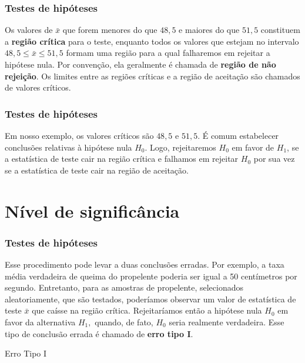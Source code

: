 \documentclass[14pt,aspectratio=1610]{beamer}
\begin{document}
\begin{frame}{}
\frametitle{Testes de hipóteses}
\begin{block}{}
\justifying
Os valores de $\bar{x}$ que forem menores do que $48,5$ e maiores do que $51,5$ constituem a \textbf{região crítica} para o teste, enquanto todos os valores que estejam 
no intervalo $48,5 \leq \bar{x}\leq 51,5$ formam uma região para a qual falharemos em rejeitar a hipótese nula. Por convenção, ela geralmente é chamada de 
\textbf{região de não rejeição}. Os limites entre as regiões críticas e a região de aceitação são chamados de valores críticos. 
 \end{block}
\end{frame}

\begin{frame}{}
\frametitle{Testes de hipóteses}
\begin{block}{}
\justifying
Em nosso exemplo, os valores críticos são $48,5$ e $51,5.$ É comum estabelecer conclusões relativas à hipótese nula $H_{0}.$ Logo, rejeitaremos $H_{0}$ em favor 
de $H_{1}$, se a estatística de teste cair na região crítica e falhamos em rejeitar $H_{0}$ por sua vez se a estatística de teste cair na região de aceitação.
 \end{block}
\end{frame}

\section{Nível de significância}
\begin{frame}{}
\frametitle{Testes de hipóteses}
\begin{block}{}
\justifying
Esse procedimento pode levar a duas conclusões erradas. Por exemplo, a taxa média verdadeira de queima do propelente poderia ser igual a 50 centímetros por segundo. 
Entretanto, para as amostras de propelente, selecionados aleatoriamente, que são testados, poderíamos observar um valor de estatística de teste $\bar{x}$ que 
caísse na região crítica. Rejeitaríamos então a hipótese nula $H_{0}$ em favor da alternativa $H_{1},$ quando, de fato, $H_{0}$ seria realmente verdadeira. Esse tipo de 
conclusão errada é chamado de \textbf{erro tipo I}.
 \end{block}
\pause
\begin{block}{Erro Tipo I}

\end{block}
\end{frame}
\end{document}

